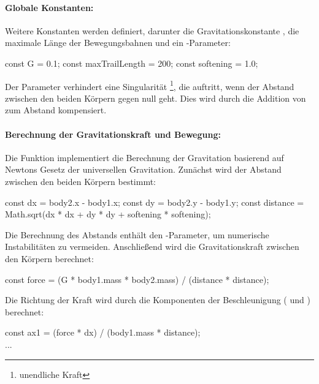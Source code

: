 \documentclass[a4paper,12pt,twoside]{article}
\begin{document}
\paragraph{Globale Konstanten:}
Weitere Konstanten werden definiert, darunter die Gravitationskonstante , die maximale Länge der Bewegungsbahnen und ein -Parameter:

\begin{javascript}
const G = 0.1;
const maxTrailLength = 200;
const softening = 1.0;
\end{javascript}

Der Parameter  verhindert eine Singularität \footnote{unendliche Kraft}, die auftritt, wenn der Abstand zwischen den beiden Körpern gegen null geht. Dies wird durch die Addition von  zum Abstand kompensiert.

\paragraph{Berechnung der Gravitationskraft und Bewegung:}
Die Funktion  implementiert die Berechnung der Gravitation basierend auf Newtons Gesetz der universellen Gravitation. Zunächst wird der Abstand zwischen den beiden Körpern bestimmt:

\begin{javascript}
const dx = body2.x - body1.x;
const dy = body2.y - body1.y;
const distance = Math.sqrt(dx * dx + dy * dy + softening * softening);
\end{javascript}

Die Berechnung des Abstands  enthält den -Parameter, um numerische Instabilitäten zu vermeiden. Anschließend wird die Gravitationskraft zwischen den Körpern berechnet:

\begin{javascript}
const force = (G * body1.mass * body2.mass) / (distance * distance);
\end{javascript}

Die Richtung der Kraft wird durch die Komponenten der Beschleunigung ( und ) berechnet:

\begin{javascript}
const ax1 = (force * dx) / (body1.mass * distance);
\\...
\end{javascript}
\end{document}
